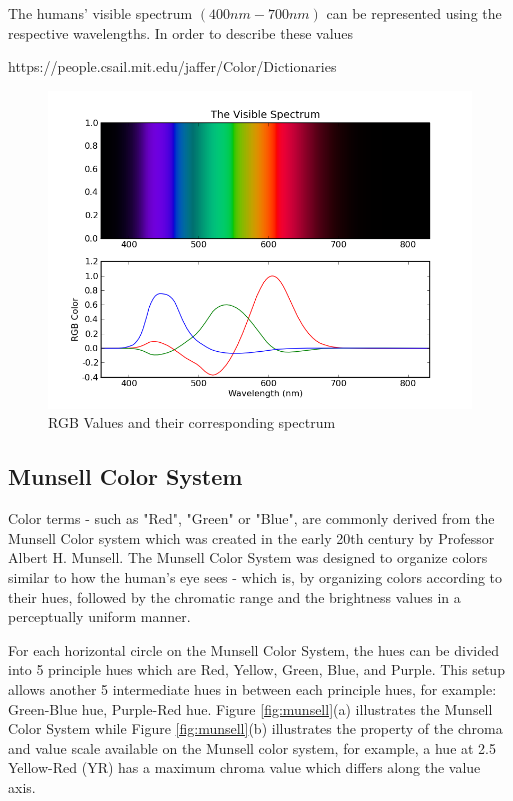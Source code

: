 The humans' visible spectrum $(400nm - 700nm)$ can be represented using the respective wavelengths. In order to describe these values 

https://people.csail.mit.edu/jaffer/Color/Dictionaries


\begin{figure}[hbt!]\centering
\includegraphics[width=.7\textwidth]{image/general/VisibleSpectrum.png}
\caption{RGB Values and their corresponding spectrum}
\label{fig:visibleSpectrum}
\end{figure}


\subsection{Munsell Color System}
\label{section:munsellcs}
Color terms - such as "Red", "Green" or "Blue", are commonly derived from the Munsell Color system which was created in the early 20th century by Professor Albert H. Munsell. The Munsell Color System was designed to organize colors similar to how the human's eye sees - which is, by organizing colors according to their hues, followed by the chromatic range and the brightness values in a perceptually uniform manner. 

For each horizontal circle on the Munsell Color System, the hues can be divided into 5 principle hues which are Red, Yellow, Green, Blue, and Purple. This setup allows another 5 intermediate hues in between each principle hues, for example: Green-Blue hue, Purple-Red hue. 
Figure \ref{fig:munsell}(a) illustrates the Munsell Color System while Figure \ref{fig:munsell}(b) illustrates the property of the chroma and value scale available on the Munsell color system, for example, a hue at 2.5 Yellow-Red (YR) has a maximum chroma value which differs along the value axis. 



